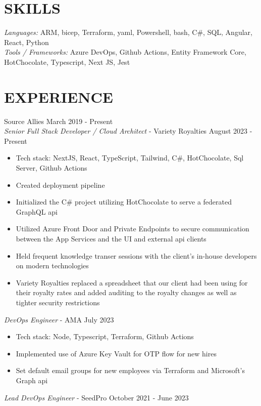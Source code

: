\documentclass[line,margin]{res}
\begin{document}
\address{(641) 814-2018 $\vert$ ajm@powderbluecrayon.com $\vert$ GitHub.com/aaronjmerrill}
\begin{resume}
 
\section{SKILLS} 
  {\sl Languages:} ARM, bicep, Terraform, yaml, Powershell, bash, C\#, SQL, Angular, React, Python\\	
  {\sl Tools / Frameworks:} Azure DevOps, Github Actions, Entity Framework Core, HotChocolate, Typescript, Next JS, Jest
 
\section{EXPERIENCE} 
	Source Allies \hfill March 2019 - Present \\ 
	{\sl Senior Full Stack Developer / Cloud Architect} - Variety Royalties \hfill August 2023 - Present
	\begin{itemize}
		\item Tech stack: NextJS, React, TypeScript, Tailwind, C\#, HotChocolate, Sql Server, Github Actions
		\item Created deployment pipeline
		\item Initialized the C\# project utilizing HotChocolate to serve a federated GraphQL api
		\item Utilized Azure Front Door and Private Endpoints to secure communication between the App Services and the UI and external api clients
		\item Held frequent knowledge transer sessions with the client's in-house developers on modern technologies
		\item Variety Royalties replaced a spreadsheet that our client had been using for their royalty rates 
			and added auditing to the royalty changes 
			as well as tighter security restrictions
	\end{itemize} 
	{\sl DevOps Engineer} - AMA \hfill July 2023
	\begin{itemize}
		\item Tech stack: Node, Typescript, Terraform, Github Actions
		\item Implemented use of Azure Key Vault for OTP flow for new hires
		\item Set default email groups for new employees via Terraform and Microsoft's Graph api
	\end{itemize} 
	{\sl Lead DevOps Engineer} - SeedPro \hfill October 2021 - June 2023 

\end{resume}
\end{document}

